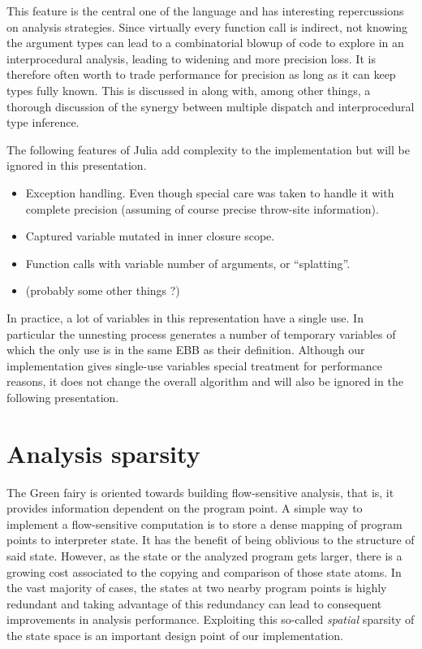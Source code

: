 \documentclass[11pt]{article}
\begin{document}
This feature is the central one of the language and has interesting repercussions on analysis strategies. Since virtually every function call is indirect, not knowing the argument types can lead to a combinatorial blowup of code to explore in an interprocedural analysis, leading to widening and more precision loss. It is therefore often worth to trade performance for precision as long as it can keep types fully known. This is discussed in \cite{jeff-phd} along with, among other things, a thorough discussion of the synergy between multiple dispatch and interprocedural type inference.

The following features of Julia add complexity to the implementation but will be ignored in this presentation.
\begin{itemize}
\item Exception handling. Even though special care was taken to handle it with complete precision (assuming of course precise throw-site information).
\item Captured variable mutated in inner closure scope.
\item Function calls with variable number of arguments, or ``splatting''.
\item (probably some other things ?)
\end{itemize}

In practice, a lot of variables in this representation have a single use.
In particular the unnesting process generates a number of temporary variables of which the only use is in the same EBB as their definition.
Although our implementation gives single-use variables special treatment for performance reasons, it does not change the overall algorithm and will also be ignored
in the following presentation.

\section*{Analysis sparsity}

The Green fairy is oriented towards building flow-sensitive analysis, that is, it provides information dependent on the program point.
A simple way to implement a flow-sensitive computation is to store a dense mapping of program points to interpreter state. It has the benefit of being oblivious to the structure of said state.
However, as the state or the analyzed program gets larger, there is a growing cost associated to the copying and comparison of those state atoms.
In the vast majority of cases, the states at two nearby program points is highly redundant and taking advantage of this redundancy can lead to consequent improvements in analysis performance. Exploiting this so-called \emph{spatial} sparsity of the state space is an important design point of our implementation.
\end{document}
